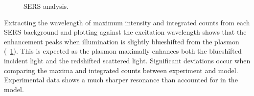 \documentclass{article}
\begin{document}
\begin{figure}[h]
\caption[]{SERS analysis.}
\label{fig:sers_analysis}
\end{figure}

Extracting the wavelength of maximum intensity and integrated counts from each SERS background and plotting against the excitation wavelength shows that the enhancement peaks when illumination is slightly blueshifted from the plasmon (\figurename~\ref{fig:sers_analysis}). This is expected as the plasmon maximally enhances both the blueshifted incident light and the redshifted scattered light. Significant deviations occur when comparing the maxima and integrated counts between experiment and model. Experimental data shows a much sharper resonance than accounted for in the model.
\end{document}
